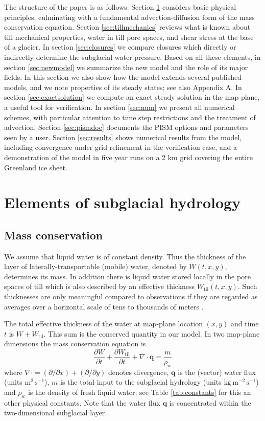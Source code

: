 \documentclass[gmd]{copernicus}   %
\newcommand{\text}{\textrm}
\newcommand\bq{\mathbf{q}}
\newcommand{\Div}{\nabla\cdot}
\newcommand{\Wtil}{W_{\text{til}}}
\begin{document}
The structure of the paper is as follows: Section \ref{sec:elements} considers basic physical principles, culminating with a fundamental advection-diffusion form of the mass conservation equation.  Section \ref{sec:tillmechanics} reviews what is known about till mechanical properties, water in till pore spaces, and shear stress at the base of a glacier.  In section \ref{sec:closures} we compare closures which directly or indirectly determine the subglacial water pressure.  Based on all these elements, in section \ref{sec:newmodel} we summarize the new model and the role of its major fields.  In this section we also show how the model extends several published models, and we note properties of its steady states; see also Appendix A.  In section \ref{sec:exactsolution} we compute an exact steady solution in the map-plane, a useful tool for verification.  In section \ref{sec:num} we present all numerical schemes, with particular attention to time step restrictions and the treatment of advection.  Section \ref{sec:pismdoc} documents the PISM options and parameters seen by a user.  Section \ref{sec:results} shows numerical results from the model, including convergence under grid refinement in the verification case, and a demonstration of the model in five year runs on a 2 km grid covering the entire Greenland ice sheet.


\section{Elements of subglacial hydrology} \label{sec:elements}

\subsection{Mass conservation}  We assume that liquid water is of constant density.  Thus the thickness of the layer of laterally-transportable (mobile) water, denoted by $W(t,x,y)$, determines its mass.  In addition there is liquid water stored locally in the pore spaces of till \citep{Tulaczyketal2000b} which is also described by an effective thickness $\Wtil(t,x,y)$.  Such thicknesses are only meaningful compared to observations if they are regarded as averages over a horizontal scale of tens to thousands of meters \citep{FlowersClarke2002_theory}.

The total effective thickness of the water at map-plane location $(x,y)$ and time $t$ is $W + \Wtil$.  This sum is the conserved quantity in our model.  In two map-plane dimensions the mass conservation equation is \citep[compare][]{Clarke05}
\begin{equation} \label{eq:conserve}
\frac{\partial W}{\partial t} + \frac{\partial \Wtil}{\partial t} + \Div \bq = \frac{m}{\rho_w}
\end{equation}
where $\Div = (\partial/\partial x) + (\partial/\partial y)$ denotes divergence, $\bq$ is the (vector) water flux (units $\text{m}^2\,\text{s}^{-1}$), $m$ is the total input to the subglacial hydrology (units $\text{kg}\,\text{m}^{-2}\,\text{s}^{-1}$) and $\rho_w$ is the density of fresh liquid water; see Table \ref{tab:constants} for this an other physical constants.  Note that the water flux $\bq$ is concentrated within the two-dimensional subglacial layer.
\end{document}
